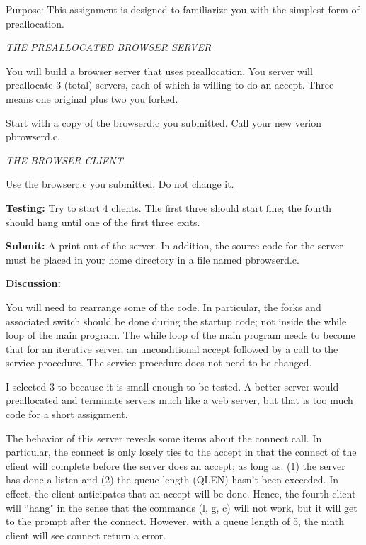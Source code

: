 

\parindent 0pt

Purpose: This assignment is designed to familiarize you
with the simplest form of preallocation.

{\it THE PREALLOCATED BROWSER SERVER}

You will build a browser server that uses preallocation.
You server will preallocate 3 (total) servers,
each of which is willing to do an accept.
Three means one original plus two you forked.

Start with a copy of the {\ltt{}browserd.c} you submitted.
Call your new verion {\ltt{}pbrowserd.c}.

{\it THE BROWSER CLIENT}

Use the {\ltt{}browserc.c} you submitted.
Do not change it.

{\bf Testing:}
Try to start 4 clients.
The first three should start fine;
the fourth should hang until one of the first three exits.

{\bf Submit:}
A print out of the server.
In addition,
the source code for the server must be placed in your home directory
in a file named {\ltt{}pbrowserd.c}.

{\bf Discussion:}

You will need to rearrange some of the code.
In particular, the forks and associated switch
should be done during the startup code;
not inside the while loop of the main program.
The while loop of the main program needs to 
become that for an iterative server;
an unconditional accept followed by a call to
the service procedure.
The service procedure does not need to be changed.

I selected 3 to because it is small enough to be tested.
A better server would preallocated and terminate servers much like a web server,
but that is too much code for a short assignment.

The behavior of this server reveals some items about the {\ltt{}connect} call.
In particular, the {\ltt{}connect} is only losely ties to the {\ltt{}accept}
in that the {\ltt{}connect} of the client will complete before the server
does an {\ltt{}accept};
as long as:
(1) the server has done a {\ltt{}listen} and (2) the queue length ({\ltt{}QLEN}) hasn't
been exceeded.
In effect, the client anticipates that an {\ltt{}accept} will be done.
Hence, the fourth client will ``hang" in the sense that the commands ({\ltt{}l}, {\ltt{}g}, {\ltt{}c})
will not work, but it will get to the prompt after the connect.
However, with a queue length of 5, the ninth client will see {\ltt{}connect} return a error. 
\bye
